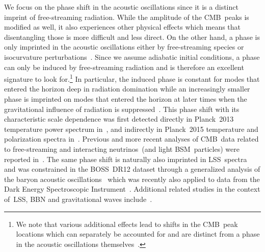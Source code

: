 \documentclass[11pt]{article}
\numberwithin{equation}{section}
\begin{document}
We focus on the phase shift in the acoustic oscillations since it is a distinct imprint of free-streaming radiation. While the amplitude of the CMB~peaks is modified as well, it also experiences other physical effects which means that disentangling those is more difficult and less direct. On the other hand, a phase is only imprinted in the acoustic oscillations either by free-streaming species or isocurvature perturbations~\cite{Baumann:2015rya}. Since we assume adiabatic initial conditions, a phase can only be induced by free-streaming radiation and is therefore an excellent signature to look for.\footnote{We note that various additional effects lead to shifts in the CMB~peak locations which can separately be accounted for and are distinct from a phase in the acoustic oscillations themselves~\cite{Pan:2016zla}.} In particular, the induced phase is constant for modes that entered the horizon deep in radiation domination while an increasingly smaller phase is imprinted on modes that entered the horizon at later times when the gravitational influence of radiation is suppressed~\cite{Bashinsky:2003tk, Baumann:2015rya}. This phase shift with its characteristic scale dependence was first detected directly in Planck~2013 temperature power spectrum in~\cite{Follin:2015hya}, and indirectly in Planck~2015 temperature and polarization spectra in~\cite{Baumann:2015rya}. Previous and more recent analyses of CMB~data related to free-streaming and interacting neutrinos~(and light BSM~particles) were reported in~\cite{Bell:2005dr, Friedland:2007vv, Cyr-Racine:2013jua, Wilkinson:2014ksa, Oldengott:2014qra, Brust:2017nmv, Lancaster:2017ksf, Choi:2018gho, Kreisch:2019yzn, Park:2019ibn, Forastieri:2019cuf, Ghosh:2019tab, Blinov:2020hmc, Das:2020xke, RoyChoudhury:2020dmd, Brinckmann:2020bcn, Ghosh:2021axu, Venzor:2022hql, Kreisch:2022zxp, Taule:2022jrz, RoyChoudhury:2022rva, Ge:2022qws, Brinckmann:2022ajr, Das:2023npl, Venzor:2023aka, Ange:2023ygk, Allali:2024cji, Ghosh:2024wva}. The same phase shift is naturally also imprinted in LSS~spectra~\cite{Baumann:2017lmt, Baumann:2017gkg, Green:2020fjb} and was constrained in the BOSS~DR12 dataset through a generalized analysis of the baryon acoustic oscillations~\cite{Baumann:2017gkg, Baumann:2019keh} which was recently also applied to data from the Dark Energy Spectroscopic Instrument~\cite{Whitford:2024ecj}. Additional related studies in the context of~LSS, BBN and gravitational waves include~\cite{Ghosh:2017jdy, Lague:2019yvs, Grohs:2020xxd, MoradinezhadDizgah:2021upg, Yeh:2022heq, Loverde:2022wih, Camarena:2023cku, He:2023oke, Lee:2023uxu, Camarena:2024daj, Bond:2024ivb}.
\end{document}
